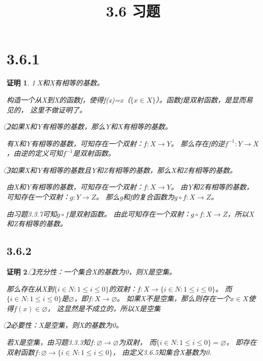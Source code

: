 \documentclass{article}
\theoremstyle{mystyle}
\theoremstyle{zproofstyle}
\newtheorem*{zproof}{证明}
\begin{document}
\title{3.6 习题}
\maketitle

\section*{3.6.1}
\begin{zproof}
  \textcircled{1}X和X有相等的基数。

  构造一个从X到X的函数f，使得f(x)=x（$\{x \in X\}$）。函数f是双射函数，是显而易见的，
  这里不做证明了。

  \textcircled{2}如果X和Y有相等的基数，那么Y和X有相等的基数。

  有X和Y有相等的基数，可知存在一个双射：$f: X \rightarrow Y$。
  那么存在f的逆$f^{-1}: Y \rightarrow X$，由逆的定义可知$f^{-1}$是双射函数。

  \textcircled{3}如果X和Y有相等的基数且Y和Z有相等的基数，那么X和Z有相等的基数。

  由X和Y有相等的基数，可知存在一个双射：$f: X \rightarrow Y$。
  由Y和Z有相等的基数，可知存在一个双射：$g: Y \rightarrow Z$。
  那么g和f的复合函数为$g \circ f: X \rightarrow Z$。

  由习题3.3.7可知$g \circ f$是双射函数。
  由此可知存在一个双射：$g \circ f: X \rightarrow Z$，所以X和Z有相等的基数。
\end{zproof}

\subsection*{3.6.2}
\begin{zproof}
  \textcircled{1}充分性：一个集合X的基数为0，则X是空集。

  那么存在从X到$\{i \in N: 1 \leq i \leq 0\}$的双射：$f: X \rightarrow \{i \in N: 1 \leq i \leq 0\}$。
  而$\{i \in N: 1 \leq i \leq 0\}$是$\varnothing$，即$f: X \rightarrow \varnothing$。
  如果X不是空集，那么则存在一个$x \in X$使得$f(x) \in \varnothing$，
  这显然是不成立的，所以X是空集

  \textcircled{2}必要性：X是空集，则X的基数为0。

  若X是空集，由习题3.3.3知$f:\varnothing \rightarrow \varnothing$为双射，
  而$\{i \in N : 1 \leq i \leq 0\}=\varnothing$，
  即存在双射函数$f:\varnothing \rightarrow \{i \in N : 1 \leq i \leq 0\}$，
  由定义3.6.5知集合X基数为0.
\end{zproof}
\end{document}
